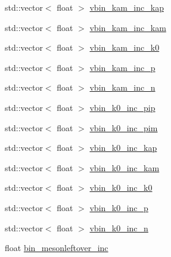 \begin{DoxyCompactItemize}
\item 
std\-::vector$<$ float $>$ \hyperlink{class_neutrino_flux_reweight_1_1_thin_target_meson_incident_reweighter_a5fdcae1a81d4af5da9972ec67395a113}{vbin\-\_\-kam\-\_\-inc\-\_\-kap}
\item 
std\-::vector$<$ float $>$ \hyperlink{class_neutrino_flux_reweight_1_1_thin_target_meson_incident_reweighter_a3cd983d528f4fd3603fef04084751df3}{vbin\-\_\-kam\-\_\-inc\-\_\-kam}
\item 
std\-::vector$<$ float $>$ \hyperlink{class_neutrino_flux_reweight_1_1_thin_target_meson_incident_reweighter_a613978871a5d27998977245f7f9d0b69}{vbin\-\_\-kam\-\_\-inc\-\_\-k0}
\item 
std\-::vector$<$ float $>$ \hyperlink{class_neutrino_flux_reweight_1_1_thin_target_meson_incident_reweighter_a3921cfcf4c109696542983913db1927e}{vbin\-\_\-kam\-\_\-inc\-\_\-p}
\item 
std\-::vector$<$ float $>$ \hyperlink{class_neutrino_flux_reweight_1_1_thin_target_meson_incident_reweighter_acf30f4374e9357a5c8b40ff459f4d2a8}{vbin\-\_\-kam\-\_\-inc\-\_\-n}
\item 
std\-::vector$<$ float $>$ \hyperlink{class_neutrino_flux_reweight_1_1_thin_target_meson_incident_reweighter_a468f0c6421e61b547e1c14a06e23ee81}{vbin\-\_\-k0\-\_\-inc\-\_\-pip}
\item 
std\-::vector$<$ float $>$ \hyperlink{class_neutrino_flux_reweight_1_1_thin_target_meson_incident_reweighter_a75f45bee6d5c569d86fb39fc8985c063}{vbin\-\_\-k0\-\_\-inc\-\_\-pim}
\item 
std\-::vector$<$ float $>$ \hyperlink{class_neutrino_flux_reweight_1_1_thin_target_meson_incident_reweighter_af7170b60c8ca1d198bb17cbbacea10e6}{vbin\-\_\-k0\-\_\-inc\-\_\-kap}
\item 
std\-::vector$<$ float $>$ \hyperlink{class_neutrino_flux_reweight_1_1_thin_target_meson_incident_reweighter_ad783e52b4a6206cbb7276d4d168b4807}{vbin\-\_\-k0\-\_\-inc\-\_\-kam}
\item 
std\-::vector$<$ float $>$ \hyperlink{class_neutrino_flux_reweight_1_1_thin_target_meson_incident_reweighter_a965f246458feafcee2f9931b2678efd8}{vbin\-\_\-k0\-\_\-inc\-\_\-k0}
\item 
std\-::vector$<$ float $>$ \hyperlink{class_neutrino_flux_reweight_1_1_thin_target_meson_incident_reweighter_a4504e9d8374cd8c8c631d25ceaf35a9d}{vbin\-\_\-k0\-\_\-inc\-\_\-p}
\item 
std\-::vector$<$ float $>$ \hyperlink{class_neutrino_flux_reweight_1_1_thin_target_meson_incident_reweighter_a406b7314c117edd343d2d9418b48262f}{vbin\-\_\-k0\-\_\-inc\-\_\-n}
\item 
float \hyperlink{class_neutrino_flux_reweight_1_1_thin_target_meson_incident_reweighter_af8a00936922518cafeca2199c385c3f8}{bin\-\_\-mesonleftover\-\_\-inc}
\end{DoxyCompactItemize}
